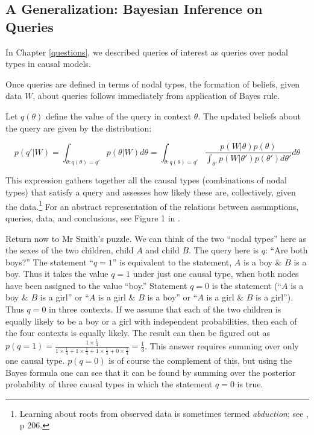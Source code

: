 \documentclass[
  12pt,
]{book}
\begin{document}
\hypertarget{a-generalization-bayesian-inference-on-queries}{%
\subsection{A Generalization: Bayesian Inference on Queries}\label{a-generalization-bayesian-inference-on-queries}}

In Chapter \ref{questions}, we described queries of interest as queries over nodal types in causal models.

Once queries are defined in terms of nodal types, the formation of beliefs, given data \(W\), about queries follows immediately from application of Bayes rule.

Let \(q(\theta)\) define the value of the query in context \(\theta\). The updated beliefs about the query are given by the distribution:

\[p(q' | W) = \int_{\theta:q(\theta) = q'} p(\theta|W)d\theta =  \int_{\theta:q(\theta) = q'} \frac{p(W|\theta)p(\theta)}{\int_{\theta'}p(W|\theta')p(\theta')d\theta'}d\theta\]

This expression gathers together all the causal types (combinations of nodal types) that satisfy a query and assesses how likely these are, collectively, given the data.\footnote{Learning about roots from observed data is sometimes termed \emph{abduction}; see \citet{pearl2009causality}, p 206.} For an abstract representation of the relations between assumptions, queries, data, and conclusions, see Figure 1 in \citet{pearl2012causal}.

Return now to Mr Smith's puzzle. We can think of the two ``nodal types'' here as the sexes of the two children, child \(A\) and child \(B\). The query here is \(q\): ``Are both boys?'' The statement ``\(q=1\)'' is equivalent to the statement, \(A\) is a boy \& \(B\) is a boy. Thus it takes the value \(q=1\) under just one causal type, when both nodes have been assigned to the value ``boy.'' Statement \(q=0\) is the statement (``\(A\) is a boy \& \(B\) is a girl'' or ``\(A\) is a girl \& \(B\) is a boy'' or ``\(A\) is a girl \& \(B\) is a girl''). Thus \(q=0\) in three contexts. If we assume that each of the two children is equally likely to be a boy or a girl with independent probabilities, then each of the four contexts is equally likely.
The result can then be figured out as \(p(q=1) = \frac{1\times \frac{1}{4}}{1\times \frac{1}{4} + 1\times \frac{1}{4}+1\times \frac{1}{4}+0\times \frac{1}{4}} = \frac{1}{3}\). This answer requires summing over only one causal type. \(p(q=0)\) is of course the complement of this, but using the Bayes formula one can see that it can be found by summing over the posterior probability of three causal types in which the statement \(q=0\) is true.
\end{document}
